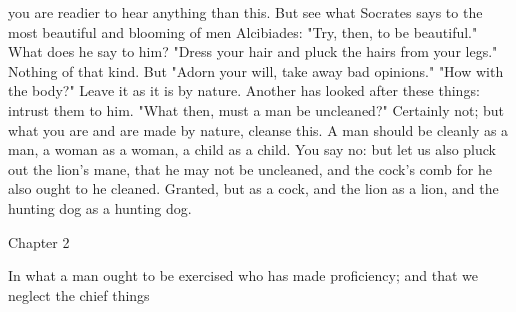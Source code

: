 \documentclass[a4paper]{article}
\begin{document}
you are readier to hear anything than this. But see what Socrates says to the
most beautiful and blooming of men Alcibiades: "Try, then, to be beautiful."
What does he say to him? "Dress your hair and pluck the hairs from your legs."
Nothing of that kind. But "Adorn your will, take away bad opinions." "How with
the body?" Leave it as it is by nature. Another has looked after these things:
intrust them to him. "What then, must a man be uncleaned?" Certainly not; but
what you are and are made by nature, cleanse this. A man should be cleanly as a
man, a woman as a woman, a child as a child. You say no: but let us also pluck
out the lion's mane, that he may not be uncleaned, and the cock's comb for he
also ought to he cleaned. Granted, but as a cock, and the lion as a lion, and
the hunting dog as a hunting dog.

Chapter 2

In what a man ought to be exercised who has made proficiency; and that we
                           neglect the chief things
\end{document}
